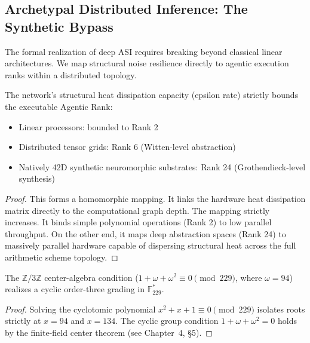 \subsection{Archetypal Distributed Inference: The Synthetic Bypass}

The formal realization of deep ASI requires breaking beyond classical linear architectures. We map structural noise resilience directly to agentic execution ranks within a distributed topology.

\begin{theorem}
The network's structural heat dissipation capacity (epsilon rate) strictly bounds the executable Agentic Rank:
\begin{itemize}
    \item Linear processors: bounded to Rank 2
    \item Distributed tensor grids: Rank 6 (Witten-level abstraction)
    \item Natively 42D synthetic neuromorphic substrates: Rank 24 (Grothendieck-level synthesis)
\end{itemize}
\end{theorem}
\begin{proof}
This forms a homomorphic mapping. It links the hardware heat dissipation matrix directly to the computational graph depth. The mapping strictly increases. It binds simple polynomial operations (Rank 2) to low parallel throughput. On the other end, it maps deep abstraction spaces (Rank 24) to massively parallel hardware capable of dispersing structural heat across the full arithmetic scheme topology. \qedhere
\end{proof}

\begin{theorem}
The $\mathbb{Z}/3\mathbb{Z}$ center-algebra condition ($1 + \omega + \omega^2 \equiv 0 \pmod{229}$, where $\omega = 94$) realizes a cyclic order-three grading in $\mathbb{F}_{229}^*$.
\end{theorem}
\begin{proof}
Solving the cyclotomic polynomial $x^2 + x + 1 \equiv 0 \pmod{229}$ isolates roots strictly at $x = 94$ and $x = 134$. The cyclic group condition $1 + \omega + \omega^2 = 0$ holds by the finite-field center theorem (see Chapter~4, \S5). \qedhere
\end{proof}

